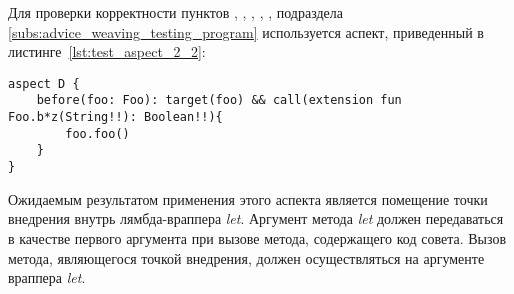 Для проверки корректности пунктов \quotes{\ref{list:lambda_wrapper_check}},
\quotes{\ref{list:buffer_method_check}},
\quotes{\ref{list:buffer_method_call_check}},
\quotes{\ref{list:pointcut_call_check}},
\quotes{\ref{list:target_use_check}}, подраздела \ref{subs:advice_weaving_testing_program}  используется аспект, приведенный в листинге~\ref{lst:test_aspect_2_2}:
\begin{lstlisting}[style={java}, label={lst:test_aspect_2_2},
  caption={Пример тестового аспекта}]
aspect D {
    before(foo: Foo): target(foo) && call(extension fun Foo.b*z(String!!): Boolean!!){
        foo.foo()
    }
}
\end{lstlisting}
Ожидаемым результатом применения этого аспекта является помещение точки внедрения внутрь лямбда-враппера \textit{let}.
Аргумент метода \textit{let} должен передаваться в качестве первого аргумента при вызове метода, содержащего код совета.
Вызов метода, являющегося точкой внедрения, должен осуществляться на аргументе враппера \textit{let}.
